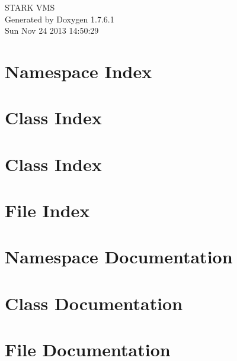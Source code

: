 \documentclass[a4paper]{book}
\begin{document}
\hypersetup{pageanchor=false,citecolor=blue}
\begin{titlepage}
\vspace*{7cm}
\begin{center}
{\Large \-S\-T\-A\-R\-K \-V\-M\-S }\\
\vspace*{1cm}
{\large \-Generated by Doxygen 1.7.6.1}\\
\vspace*{0.5cm}
{\small Sun Nov 24 2013 14:50:29}\\
\end{center}
\end{titlepage}
\clearemptydoublepage
{}
\tableofcontents
\clearemptydoublepage
{}
\hypersetup{pageanchor=true,citecolor=blue}
\chapter{\-Namespace \-Index}

\chapter{\-Class \-Index}

\chapter{\-Class \-Index}

\chapter{\-File \-Index}

\chapter{\-Namespace \-Documentation}





\chapter{\-Class \-Documentation}












\chapter{\-File \-Documentation}












\printindex
\end{document}
